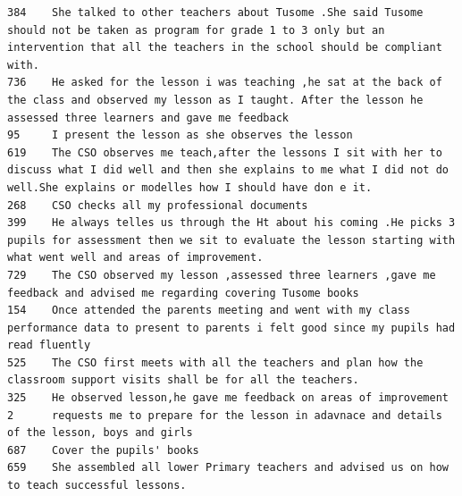 \documentclass[11pt]{article}
\begin{document}
    \begin{Verbatim}[commandchars=\\\{\}]
384    She talked to other teachers about Tusome .She said Tusome should not be taken as program for grade 1 to 3 only but an intervention that all the teachers in the school should be compliant with.
736    He asked for the lesson i was teaching ,he sat at the back of the class and observed my lesson as I taught. After the lesson he assessed three learners and gave me feedback                     
95     I present the lesson as she observes the lesson                                                                                                                                                  
619    The CSO observes me teach,after the lessons I sit with her to discuss what I did well and then she explains to me what I did not do well.She explains or modelles how I should have don e it.    
268    CSO checks all my professional documents                                                                                                                                                         
399    He always telles us through the Ht about his coming .He picks 3 pupils for assessment then we sit to evaluate the lesson starting with what went well and areas of improvement.                  
729    The CSO observed my lesson ,assessed three learners ,gave me feedback and advised me regarding covering Tusome books                                                                             
154    Once attended the parents meeting and went with my class performance data to present to parents i felt good since my pupils had read fluently                                                    
525    The CSO first meets with all the teachers and plan how the classroom support visits shall be for all the teachers.                                                                               
325    He observed lesson,he gave me feedback on areas of improvement                                                                                                                                   
2      requests me to prepare for the lesson in adavnace and details of the lesson, boys and girls                                                                                                      
687    Cover the pupils' books                                                                                                                                                                          
659    She assembled all lower Primary teachers and advised us on how to teach successful lessons.                                                                                                      

\end{Verbatim}
\end{document}
